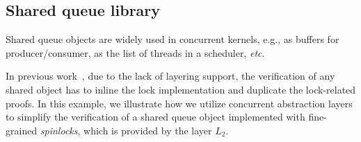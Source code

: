 {\subsection{Shared queue library}
\label{sec:con:queue} 
Shared queue objects
are widely used in concurrent kernels, e.g., as buffers for producer/consumer,
as the list of threads in a scheduler, {\it etc}.
In previous work~\cite{lili16},
due to the lack of layering support,
the verification of any shared object
has to inline the lock implementation
and duplicate the lock-related proofs.
In this example, we illustrate how we utilize concurrent
abstraction layers to simplify the verification of a shared queue object 
implemented with fine-grained \emph{spinlocks}, which is provided by the layer $L_2$.

}
